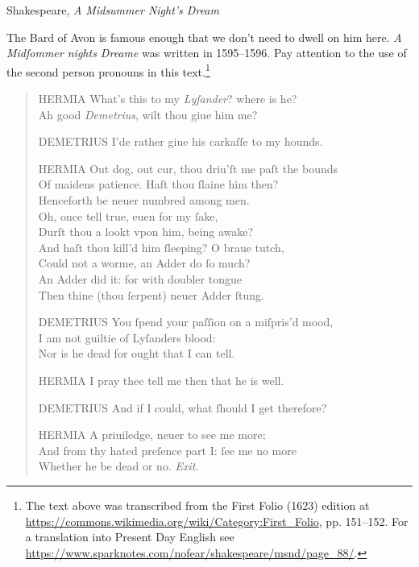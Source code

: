 \largerpage
\begin{texts}{Shakespeare, \emph{A Midsummer Night's Dream}}

The Bard of Avon is famous enough that we don't need to dwell on him here. \emph{A Midſommer nights Dreame} was written in 1595--1596. Pay attention to the use of the second person pronouns in this text.\footnote{The text above was transcribed from the First Folio (1623) edition at \url{https://commons.wikimedia.org/wiki/Category:First_Folio}, pp. 151--152. For a translation into Present Day English see \url{https://www.sparknotes.com/nofear/shakespeare/msnd/page_88/}.}

\begin{quote}
    \internallinenumbers*{}
    HERMIA\phantom{XX} What's this to my \emph{Lyſander}? where is he?\\
    \phantom{HERMIAXX} Ah good \emph{Demetrius}, wilt thou giue him me?
    
    DEMETRIUS I'de rather giue his carkaſſe to my hounds.
    
    HERMIA\phantom{XX} Out dog, out cur, thou driu'ſt me paſt the bounds\\
	\phantom{HERMIAXX}		Of maidens patience. Haſt thou ſlaine him then?\\
	\phantom{HERMIAXX}		Henceforth be neuer numbred among men.\\
	\phantom{HERMIAXX}		Oh, once tell true, euen for my ſake,\\
	\phantom{HERMIAXX}		Durſt thou a lookt vpon him, being awake?\\
	\phantom{HERMIAXX}		And haſt thou kill'd him ſleeping? O braue tutch,\\
	\phantom{HERMIAXX}		Could not a worme, an Adder do ſo much?\\
	\phantom{HERMIAXX}		An Adder did it: for with doubler tongue\\
	\phantom{HERMIAXX}		Then thine (thou ſerpent) neuer Adder ſtung.

    DEMETRIUS You ſpend your paſſion on a miſpris'd mood,\\
	\phantom{DEMETRIUS}		I am not guiltie of Lyſanders blood:\\
	\phantom{DEMETRIUS}		Nor is he dead for ought that I can tell.

    HERMIA\phantom{XX} I pray thee tell me then that he is well.

    DEMETRIUS And if I could, what ſhould I get therefore?

    HERMIA\phantom{XX} A priuiledge, neuer to see me more;\\
	\phantom{HERMIAXX}		And from thy hated preſence part I: ſee me no more\\
	\phantom{HERMIAXX}		Whether he be dead or no. \hfill \emph{Exit.}
	

\end{quote}
\end{texts}
